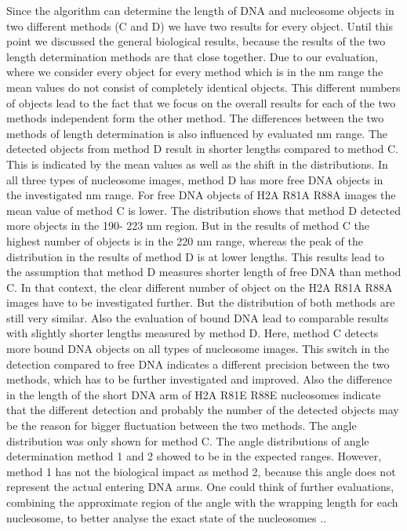 \documentclass{article}
\begin{document}
Since the algorithm can determine the length of DNA and nucleosome objects in two different methods (C and D) we have two results for every object. Until this point we discussed the general biological results, because the results of the two length determination methods are that close together. Due to our evaluation, where we consider every object for every method which is in the nm range the mean values do not consist of completely identical objects. This different numbers of objects lead to the fact that we focus on the overall results for each of the two methods independent form the other method. The differences between the two methods of length determination is also influenced by evaluated nm range.
The detected objects from method D result in shorter lengths compared to method C. This is indicated by the mean values as well as the shift in the distributions. In all three types of nucleosome images, method D has more free DNA objects in the investigated nm range. For free DNA objects of H2A R81A R88A images the mean value of method C is lower. The distribution shows that method D detected more objects in the 190- 223 nm region. But in the results of method C the highest number of objects is in the 220 nm range, whereas the peak of the distribution in the results of method D is at lower lengths. This results lead to the assumption that method D measures shorter length of free DNA than method C. In that context, the clear different number of object on the H2A R81A R88A images have to be investigated further. But the distribution of both methods are still very similar.
Also the evaluation of bound DNA lead to comparable results with slightly shorter lengths measured by method D. Here, method C detects more bound DNA objects on all types of nucleosome images. This switch in the detection compared to free DNA indicates a different precision between the two methods, which has to be further investigated and improved. Also the difference in the length of the short DNA arm of H2A R81E R88E nucleosomes indicate that the different detection and probably the number of the detected objects may be the reason for bigger fluctuation between the two methods. 
The angle distribution was only shown for method C. The angle distributions of angle determination method 1 and 2 showed to be in the expected ranges. However, method 1 has not the biological impact as method 2, because this angle does not represent the actual entering DNA arms. One could think of further evaluations, combining the approximate region of the angle with the wrapping length for each nucleosome, to better analyse the exact state of the nucleosomes \cite{nishikawa2012selective}..
\end{document}
